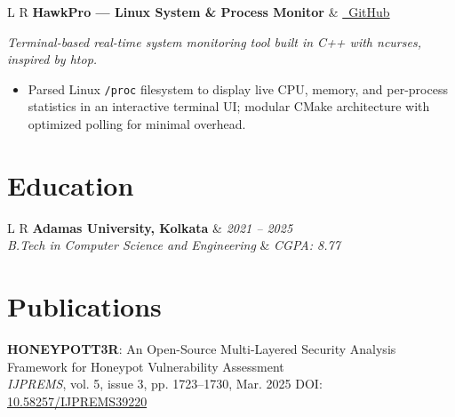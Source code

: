 \documentclass[10pt,a4paper]{article}
\begin{document}
\vspace{5pt}
\noindent
\begin{tabularx}{\textwidth}{L R}
  \textbf{HawkPro --- Linux System \& Process Monitor} & \href{https://github.com/3rr0r-505/HawkPro}{\textcolor{accent}{\faGithub\ GitHub}} \\
\end{tabularx}
\vspace{1pt}
\textit{\small Terminal-based real-time system monitoring tool built in C++ with ncurses, inspired by htop.}
\begin{itemize}[leftmargin=3.5ex, itemsep=2.5pt, topsep=3pt]
  \small
  \item Parsed Linux \texttt{/proc} filesystem to display live CPU, memory, and per-process statistics in an interactive terminal UI; modular CMake architecture with optimized polling for minimal overhead.
\end{itemize}

\section{Education}
\noindent
\begin{tabularx}{\textwidth}{L R}
  \textbf{Adamas University, Kolkata} & \textit{2021 -- 2025} \\
  \textit{B.Tech in Computer Science and Engineering} & \textit{CGPA: 8.77} \\
\end{tabularx}

\section{Publications}
\small
\textbf{HONEYPOTT3R}: An Open-Source Multi-Layered Security Analysis Framework for Honeypot Vulnerability Assessment \\[2pt]
\textit{IJPREMS}, vol. 5, issue 3, pp. 1723--1730, Mar. 2025 \hfill DOI: \href{https://doi.org/10.58257/IJPREMS39220}{\textcolor{accent}{10.58257/IJPREMS39220}}

\end{document}
